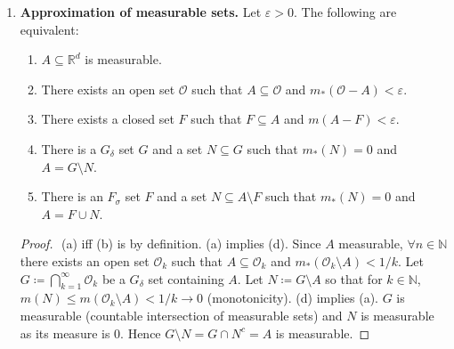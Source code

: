 \begin{enumerate}
\begin{proof}
	\end{proof}
\item \textbf{Approximation of measurable sets.} Let \( \varepsilon > 0 \). The following are equivalent:
	\begin{enumerate}
		\item \( A \subseteq \mathbb{R}^{d} \) is measurable.
		\item There exists an open set \( \mathcal{O}  \) such that \( A \subseteq \mathcal{O}  \) and \( m_*(\mathcal{O} - A) < \varepsilon .  \)
		\item There exists a closed set \( F  \) such that \( F \subseteq A \) and \( m(A - F) < \varepsilon  \).
		\item There is a \( G_\delta  \) set \( G \) and a set \( N \subseteq G \) such that \( m_*(N) = 0 \) and \( A = G \setminus N \).
		\item There is an \( F_\sigma  \) set \( F \) and a set \( N \subseteq A \setminus F \) such that \( m_*(N) = 0 \) and \( A = F \cup N \).
	\end{enumerate}
	\begin{proof}\renewcommand{\qedsymbol}{}$ $ \newline
	(a) iff (b) is by definition. (a) implies (d). Since \( A \) measurable, \( \forall n \in \mathbb{N}  \) there exists an open set \( \mathcal{O} _k \) such that \( A \subseteq \mathcal{O} _k \) and \( m_*(\mathcal{O} _k \setminus A) < 1 / k \). Let \( G \coloneqq \bigcap_{k=1}^{\infty} \mathcal{O} _k \) be a \( G_\delta  \) set containing \( A \). Let \( N \coloneqq G \setminus A \) so that for \( k \in \mathbb{N}  \), \( m(N) \leq m(\mathcal{O} _k \setminus A) < 1/k \to 0\) (monotonicity). (d) implies (a). \( G \) is measurable (countable intersection of measurable sets) and \( N \) is measurable as its measure is 0. Hence \( G \setminus N = G \cap N^{c} = A \) is measurable.


\end{proof}
\end{enumerate}
